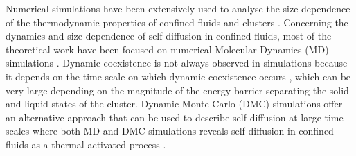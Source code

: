 Numerical simulations have been extensively used to analyse the size dependence of the thermodynamic properties of confined fluids and clusters \cite{briant1975molecular,Honeycutt:1987,berry1988solid,Quirke:1988,Polak:2006}. Concerning the dynamics and size-dependence of self-diffusion in confined fluids, most of the theoretical work have been focused on numerical Molecular Dynamics (MD) simulations \cite{Beck1990,Erpenbeck:1991,Yeh:2004,Thompson1992,Gao1997,Mittal:2008,Matsubara:2012}. Dynamic coexistence is not always observed in simulations \cite{Cleveland:1999} because it depends on the time scale on which dynamic coexistence occurs \cite{schebarchov2005static}, which can be very large depending on the magnitude of the energy barrier separating the solid and liquid states of the cluster. Dynamic Monte Carlo (DMC) simulations \cite{Binder1994} offer an alternative approach that can be used to describe self-diffusion at large time scales \cite{Huitema:1999} where both MD and DMC simulations reveals self-diffusion in confined fluids as a thermal activated process \cite{Matsubara:2012}. \\

